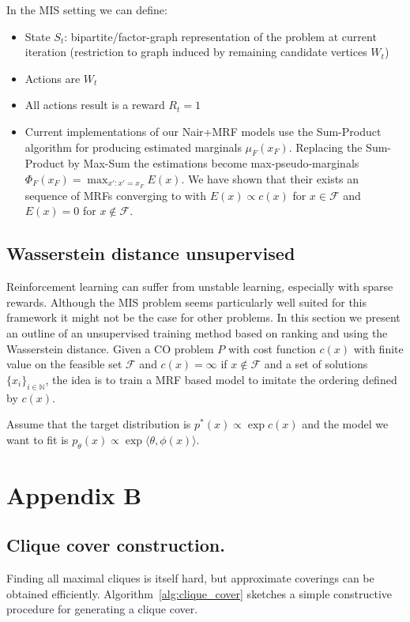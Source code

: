 \begin{appendices}
In the MIS setting we can define:
\begin{itemize}
	\item State $S_t$: bipartite/factor-graph representation of the problem at current iteration (restriction to graph induced by remaining candidate vertices $W_t$)
	\item Actions are $W_t$
	\item All actions result is a reward $R_t = 1$
	\item Current implementations of our Nair+MRF models use the Sum-Product algorithm for producing estimated marginals $\mu_F(x_F)$. Replacing the Sum-Product by Max-Sum the estimations become max-pseudo-marginals $\Phi_F(x_F) = \max_{x': x'=x_F} E(x)$. We have shown that their exists an sequence of MRFs converging to with $E(x) \propto c(x)$ for $x\in\mathcal{F}$ and $E(x) = 0$ for $x\notin \mathcal{F}$. 
\end{itemize}


\section{Wasserstein distance unsupervised} Reinforcement learning can suffer from unstable learning, especially with sparse rewards. Although the MIS problem seems particularly well suited for this framework it might not be the case for other problems. In this section we present an outline of an unsupervised training method based on ranking and using the Wasserstein distance. Given a CO problem $P$ with cost function $c(x)$ with finite value on the feasible set $\mathcal{F}$ and $c(x)=\infty$ if $x\notin \mathcal{F}$ and a set of solutions $\{ x_i \}_{i\in\mathbb{N}}$, the idea is to train a MRF based model to imitate the ordering defined by $c(x)$. 

Assume that the target distribution is $p^*(x) \propto \exp c(x)$ and the model we want to fit is $p_{\theta}(x) \propto \exp \langle \theta , \phi(x) \rangle$. 


\newpage
\pagecolor{Wheat1}
\chapter{Appendix B}
\label{appendix_b}

\section{Clique cover construction.}  
Finding all maximal cliques is itself hard, but approximate coverings can be obtained efficiently. Algorithm~\ref{alg:clique_cover} sketches a simple constructive procedure for generating a clique cover.


\end{appendices}
